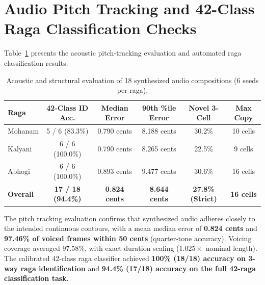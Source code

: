 \documentclass[12pt,a4paper]{report}
\begin{document}
\section{Audio Pitch Tracking and 42-Class Raga Classification Checks}
Table~\ref{tab:audio_eval} presents the acoustic pitch-tracking evaluation and automated raga classification results.

\begin{table}[h!]
\centering
\caption{Acoustic and structural evaluation of 18 synthesized audio compositions (6 seeds per raga).}
\label{tab:audio_eval}
\vspace{0.5em}
\footnotesize
\begin{tabular}{@{}lccccc@{}}
\toprule
\textbf{Raga} & \textbf{42-Class ID Acc.} & \textbf{Median Error} & \textbf{90th \%ile Error} & \textbf{Novel 3-Cell} & \textbf{Max Copy} \\
\midrule
Mohanam & 5 / 6 (83.3\%) & 0.790 cents & 8.188 cents & 30.2\% & 10 cells \\
Kalyani & 6 / 6 (100.0\%) & 0.790 cents & 8.265 cents & 22.5\% & 9 cells \\
Abhogi & 6 / 6 (100.0\%) & 0.893 cents & 9.477 cents & 30.6\% & 16 cells \\
\midrule
\textbf{Overall} & \textbf{17 / 18 (94.4\%)} & \textbf{0.824 cents} & \textbf{8.644 cents} & \textbf{27.8\% (Strict)} & \textbf{16 cells} \\
\bottomrule
\end{tabular}
\end{table}

The pitch tracking evaluation confirms that synthesized audio adheres closely to the intended continuous contours, with a mean median error of \textbf{0.824 cents} and \textbf{97.46\% of voiced frames within 50 cents} (quarter-tone accuracy). Voicing coverage averaged 97.58\%, with exact duration scaling ($1.025 \times$ nominal length). The calibrated 42-class raga classifier achieved \textbf{100\% (18/18) accuracy on 3-way raga identification} and \textbf{94.4\% (17/18) accuracy on the full 42-raga classification task}.
\end{document}
